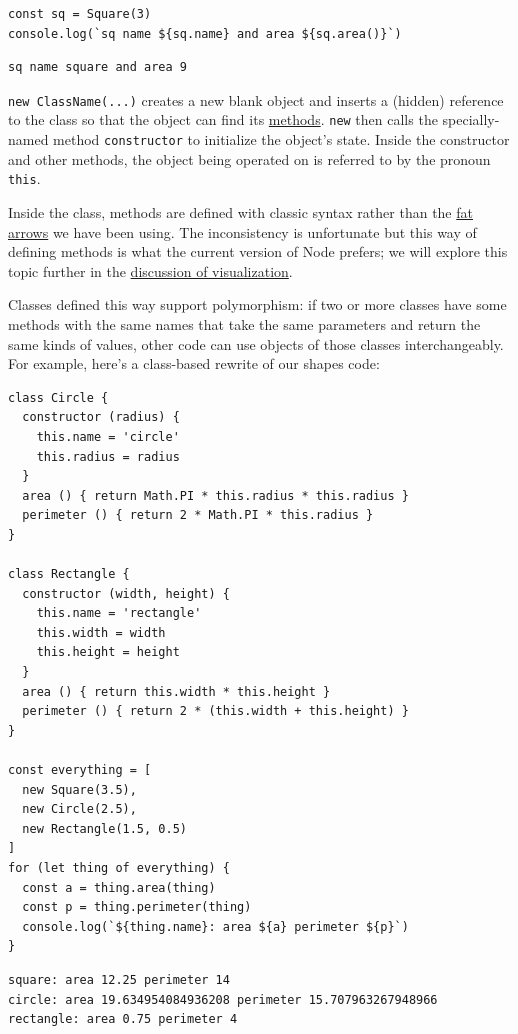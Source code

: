 \begin{verbatim}
const sq = Square(3)
console.log(`sq name ${sq.name} and area ${sq.area()}`)
\end{verbatim}

\begin{verbatim}
sq name square and area 9
\end{verbatim}

\texttt{new\ ClassName(...)} creates a new blank object and inserts a
(hidden) reference to the class so that the object can find its
\protect\hyperlink{g:method}{methods}. \texttt{new} then calls the
specially-named method \texttt{constructor} to initialize the object's
state. Inside the constructor and other methods, the object being
operated on is referred to by the pronoun \texttt{this}.

Inside the class, methods are defined with classic syntax rather than
the \protect\hyperlink{g:fat-arrow}{fat arrows} we have been using. The
inconsistency is unfortunate but this way of defining methods is what
the current version of Node prefers; we will explore this topic further
in the \protect\hyperlink{s:vis}{discussion of visualization}.

Classes defined this way support polymorphism: if two or more classes
have some methods with the same names that take the same parameters and
return the same kinds of values, other code can use objects of those
classes interchangeably. For example, here's a class-based rewrite of
our shapes code:

\begin{verbatim}
class Circle {
  constructor (radius) {
    this.name = 'circle'
    this.radius = radius
  }
  area () { return Math.PI * this.radius * this.radius }
  perimeter () { return 2 * Math.PI * this.radius }
}

class Rectangle {
  constructor (width, height) {
    this.name = 'rectangle'
    this.width = width
    this.height = height
  }
  area () { return this.width * this.height }
  perimeter () { return 2 * (this.width + this.height) }
}

const everything = [
  new Square(3.5),
  new Circle(2.5),
  new Rectangle(1.5, 0.5)
]
for (let thing of everything) {
  const a = thing.area(thing)
  const p = thing.perimeter(thing)
  console.log(`${thing.name}: area ${a} perimeter ${p}`)
}
\end{verbatim}

\begin{verbatim}
square: area 12.25 perimeter 14
circle: area 19.634954084936208 perimeter 15.707963267948966
rectangle: area 0.75 perimeter 4
\end{verbatim}

